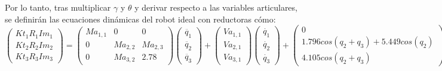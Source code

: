 Por lo tanto, tras multiplicar $\gamma$ y $\theta$ y derivar respecto a las variables articulares, se definirán las ecuaciones dinámicas del robot ideal con reductoras cómo:\\



\[
\begin{pmatrix}
Kt_{1}R_{1}Im_{1} \\

Kt_{2}R_{2}Im_{2} \\

Kt_{3}R_{3}Im_{3}
\end{pmatrix} =
\begin{pmatrix}
Ma_{1,1} & 0 & 0 \\

0 & Ma_{2,2} & Ma_{2,3}\\

0 & Ma_{3,2} & 2.78
\end{pmatrix}
\begin{pmatrix}
\ddot{q_{1}} \\

\ddot{q_{2}}  \\

\ddot{q_{3}}
\end{pmatrix} +
\begin{pmatrix}
Va_{1,1}\\

Va_{2,1} \\

Va_{3,1}
\end{pmatrix}
\begin{pmatrix}
\dot{q_{1}} \\

\dot{q_{2}}  \\

\dot{q_{3}}
\end{pmatrix} +
\begin{pmatrix}
0																	\\

1.796cos(q_2 + q_3) + 5.449cos(q_2) \\

4.105cos(q_2 + q_3)
\end{pmatrix}\]



